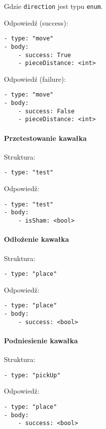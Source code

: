\documentclass[a4paper]{article}
\newcommand{\code}{\texttt}
\begin{document}
Gdzie \code{direction} jest typu \code{enum}.

Odpowiedź (success):

\begin{verbatim}
- type: "move"
- body:
    - success: True
    - pieceDistance: <int>
\end{verbatim}

Odpowiedź (failure):

\begin{verbatim}
- type: "move"
- body:
    - success: False
    - pieceDistance: <int>
\end{verbatim}

\paragraph{Przetestowanie kawałka}
\hfill

Struktura:

\begin{verbatim}
- type: "test"
\end{verbatim}

Odpowiedź:

\begin{verbatim}
- type: "test"
- body:
    - isSham: <bool>
\end{verbatim}

\paragraph{Odłożenie kawałka}
\hfill

Struktura:

\begin{verbatim}
- type: "place"
\end{verbatim}

Odpowiedź:

\begin{verbatim}
- type: "place"
- body:
    - success: <bool>
\end{verbatim}

\paragraph{Podniesienie kawałka}
\hfill

Struktura:

\begin{verbatim}
- type: "pickUp"
\end{verbatim}

Odpowiedź:

\begin{verbatim}
- type: "place"
- body:
    - success: <bool>
\end{verbatim}
\end{document}

